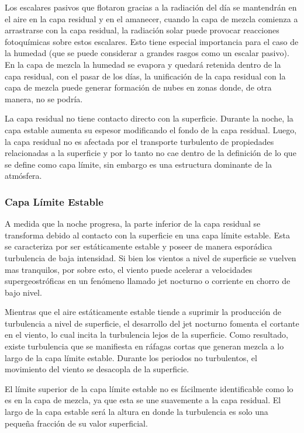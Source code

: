 Los escalares pasivos que flotaron gracias a la radiación del día se mantendrán en el aire en la capa residual y en el amanecer, cuando la capa de mezcla comienza a arrastrarse con la capa residual, la radiación solar puede provocar reacciones fotoquímicas sobre estos escalares. Esto tiene especial importancia para el caso de la humedad (que se puede considerar a grandes rasgos como un escalar pasivo). En la capa de mezcla la humedad se evapora y quedará retenida dentro de la capa residual, con el pasar de los días, la unificación de la capa residual con la capa de mezcla puede generar formación de nubes en zonas donde, de otra manera, no se podría.

La capa residual no tiene contacto directo con la superficie. Durante la noche, la capa estable aumenta su espesor modificando el fondo de la capa residual. Luego, la capa residual no es afectada por el transporte turbulento de propiedades relacionadas a la superficie y por lo tanto no cae dentro de la definición de lo que se define como capa límite, sin embargo es una estructura dominante de la atmósfera.
\subsubsection{Capa Límite Estable}
A medida que la noche progresa, la parte inferior de la capa residual se transforma debido al contacto con la superficie en una capa límite estable. Esta se caracteriza por ser estáticamente estable y poseer de manera esporádica turbulencia de baja intensidad. Si bien los vientos a nivel de superficie se vuelven mas tranquilos, por sobre esto, el viento puede acelerar a velocidades supergeostróficas en un fenómeno llamado jet nocturno o corriente en chorro de bajo nivel.

Mientras que el aire estáticamente estable tiende a suprimir la producción de turbulencia a nivel de superficie, el desarrollo del jet nocturno fomenta el cortante en el viento, lo cual incita la turbulencia lejos de la superficie. Como resultado, existe turbulencia que se manifiesta en ráfagas cortas que generan mezcla a lo largo de la capa límite estable. Durante los periodos no turbulentos, el movimiento del viento se desacopla de la superficie.

El límite superior de la capa límite estable no es fácilmente identificable como lo es en la capa de mezcla, ya que esta se une suavemente a la capa residual. El largo de la capa estable será la altura en donde la turbulencia es solo una pequeña fracción de su valor superficial.

